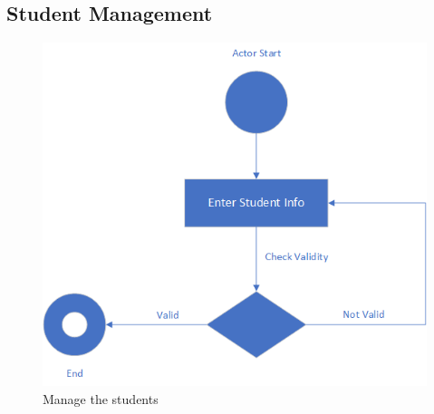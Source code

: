 \documentclass[12pt,a4paper]{article}
\begin{document}
\subsection{Student Management}
\begin{figure}[H]
  \centering
    \includegraphics[scale=1]{Student}
    
  \caption{Manage the students}
\end{figure}
\end{document}
